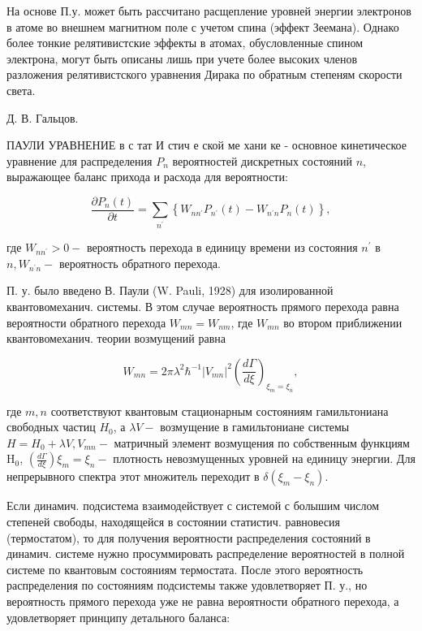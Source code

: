 \documentclass[10pt]{article}
\begin{document}
На основе П.у. может быть рассчитано расщепление уровней энергии электронов в атоме во внешнем магнитном поле с учетом спина (эффект Зеемана). Однако более тонкие релятивистские эффекты в атомах, обусловленные спином электрона, могут быть описаны лишь при учете более высоких членов разложения релятивистского уравнения Дирака по обратным степеням скорости света.



Д. В. Гальцов.



ПАУЛИ УРАВНЕНИЕ в с тат И стич е ской ме хани ке - основное кинетическое уравнение для распределения $P_{n}$ вероятностей дискретных состояний $n$, выражающее баланс прихода и расхода для вероятности:



\[

\frac{\partial P_{n}(t)}{\partial t}=\sum_{n^{\prime}}\left\{W_{n n^{\prime}} P_{n^{\prime}}(t)-W_{n^{\prime} n} P_{n}(t)\right\},

\]



где $W_{n n^{\prime}}>0-$ вероятность перехода в единицу времени из состояния $n^{\prime}$ в $n, W_{n^{\prime} n}-$ вероятность обратного перехода.



П. у. было введено В. Паули (W. Pauli, 1928) для изолированной квантовомеханич. системы. В этом случае вероятность прямого перехода равна вероятности обратного перехода $W_{m n}=W_{n m}$, где $W_{m n}$ во втором приближении квантовомеханич. теории возмущений равна



\[

W_{m n}=2 \pi \lambda^{2} \hbar^{-1}\left|V_{m n}\right|^{2}\left(\frac{d \Gamma}{d \xi}\right)_{\xi_{m}=\xi_{n}},

\]



где $m, n$ соответствуют квантовым стационарным состояниям гамильтониана свободных частиц $H_{0}$, а $\lambda V-$ возмущение в гамильтониане системы $H=H_{0}+\lambda V, V_{m n}-$ матричный элемент возмущения по собственным функциям $\mathrm{H}_{0}$, $\left(\frac{d \Gamma}{d \xi}\right) \xi_{m}=\xi_{n}-$ плотность невозмущенных уровней на единицу энергии. Для непрерывного спектра этот множитель переходит в $\delta\left(\xi_{m}-\xi_{n}\right)$.



Если динамич. подсистема взаимодействует с системой с болышим числом степеней свободы, находящейся в состоянии статистич. равновесия (термостатом), то для получения вероятности распределения состояний в динамич. системе нужно просуммировать распределение вероятностей в полной системе по квантовым состояниям термостата. После этого вероятность распределения по состояниям подсистемы также удовлетворяет П. у., но вероятность прямого перехода уже не равна вероятности обратного перехода, а удовлетворяет принципу детального баланса:
\end{document}
